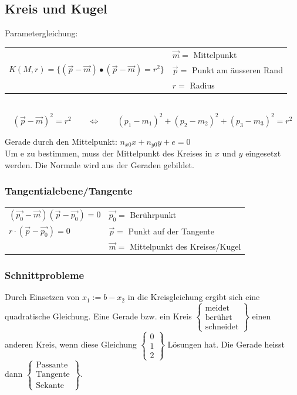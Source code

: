 \subsection{Kreis und Kugel}
	Parametergleichung: \begin{tabular}{ll}
		& $\vec{m} =$ Mittelpunkt \\
		$K(M,r) = \lbrace (\vec{p} - \vec{m}) \bullet (\vec{p} - \vec{m}) = r^2 \rbrace$ & $\vec{p} =$ Punkt am äusseren Rand\\
		& $r =$ Radius
	\end{tabular}\\

	\begin{equation*}
		(\vec{p} - \vec{m})^2 = r^2  \qquad \Leftrightarrow \qquad (p_1 - m_1)^2 + (p_2 - m_2)^2 + (p_3 - m_3)^2 = r^2
	\end{equation*}
	
	Gerade durch den Mittelpunkt: $n_{x0}x+n_{y0}y+e=0$  \\
	Um e zu bestimmen, muss der Mittelpunkt des Kreises in $x$ und $y$ eingesetzt werden. Die Normale wird aus der Geraden gebildet.
	\subsubsection{Tangentialebene/Tangente}
		\begin{tabular}{ll}
			$(\vec{p_0} - \vec{m})(\vec{p} - \vec{p_0}) = 0$ & $\vec{p_0} =$ Berührpunkt\\
			$r \cdot (\vec{p} - \vec{p_0}) = 0$ &  $\vec{p} =$ Punkt auf der Tangente\\
			&  $\vec{m} =$ Mittelpunkt des Kreises/Kugel
		\end{tabular}


	\subsubsection{Schnittprobleme}
		Durch Einsetzen von $x_1:=b-x_2$ in die Kreisgleichung ergibt sich eine
		quadratische Gleichung. Eine Gerade bzw. ein Kreis
		$\left\{\begin{array}{l}\mbox{meidet}\\ \mbox{berührt}\\ \mbox{schneidet}\end{array}\right\}$ einen
		anderen Kreis, wenn diese Gleichung
		$\left\{\begin{array}{l}0\\1\\2\end{array}\right\}$ Lösungen hat. Die Gerade
		heisst dann
		$\left\{\begin{array}{l} \mbox{Passante}\\ \mbox{Tangente}\\ \mbox{Sekante}\end{array}\right\}$. 
	
